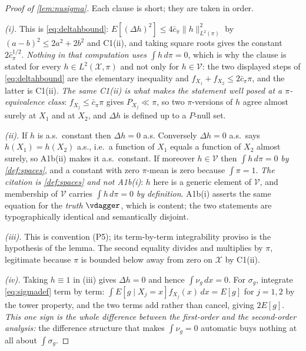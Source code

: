 \begin{proof}[Proof of \cref{lem:nusigma}]
Each clause is short; they are taken in order.

\emph{(i).} This is \eqref{eq:deltahbound}: $E[(\Delta h)^{2}]\le4\bar c_\pi\|h\|^{2}_{L^{2}(\pi)}$ by
$(a-b)^{2}\le2a^{2}+2b^{2}$ and C1(ii), and taking square roots gives the constant $2\bar c_\pi^{1/2}$.
\emph{Nothing in that computation uses $\int h\,d\pi=0$}, which is why the clause is stated for every
$h\in L^{2}(\mathcal X,\pi)$ and not only for $h\in\mathcal V$: the two displayed steps of
\eqref{eq:deltahbound} are the elementary inequality and $f_{X_1}+f_{X_2}\le2\bar c_\pi\pi$, and the
latter is C1(ii). \emph{The same C1(ii) is what makes the statement well posed at a $\pi$-equivalence
class}: $f_{X_j}\le\bar c_\pi\pi$ gives $P_{X_j}\ll\pi$, so two $\pi$-versions of $h$ agree almost surely
at $X_1$ and at $X_2$, and $\Delta h$ is defined up to a $P$-null set.

\emph{(ii).} If $h$ is a.s.\ constant then $\Delta h=0$ a.s. Conversely $\Delta h=0$ a.s.\ says
$h(X_1)=h(X_2)$ a.s., i.e.\ a function of $X_1$ equals a function of $X_2$ almost surely, so A1b(ii)
makes it a.s.\ constant. If moreover $h\in\mathcal V$ then $\int h\,d\pi=0$ \emph{by \cref{def:spaces}},
and a constant with zero $\pi$-mean is zero because $\int\pi=1$. \emph{The citation is
\cref{def:spaces} and not A1b(i)}: $h$ here is a generic element of $\mathcal V$, and membership of
$\mathcal V$ carries $\int h\,d\pi=0$ \emph{by definition}. A1b(i) asserts the same equation for the
\emph{truth} $\vdagger$, which is content; the two statements are typographically identical and
semantically disjoint.

\emph{(iii).} This is convention (P5); its term-by-term integrability proviso is the hypothesis of the
lemma. The second equality divides and multiplies by $\pi$, legitimate because $\pi$ is bounded below
away from zero on $\mathcal X$ by C1(ii).

\emph{(iv).} Taking $h\equiv1$ in (iii) gives $\Delta h=0$ and hence $\int\nu_g\,dx=0$. For $\sigma_g$,
integrate \eqref{eq:sigmadef} term by term: $\int E[g\mid X_j=x]f_{X_j}(x)\,dx=E[g]$ for $j=1,2$ by the
tower property, and the two terms add rather than cancel, giving $2E[g]$. \emph{This one sign is the
whole difference between the first-order and the second-order analysis:} the difference structure that
makes $\int\nu_g=0$ automatic buys nothing at all about $\int\sigma_g$.


\end{proof}
